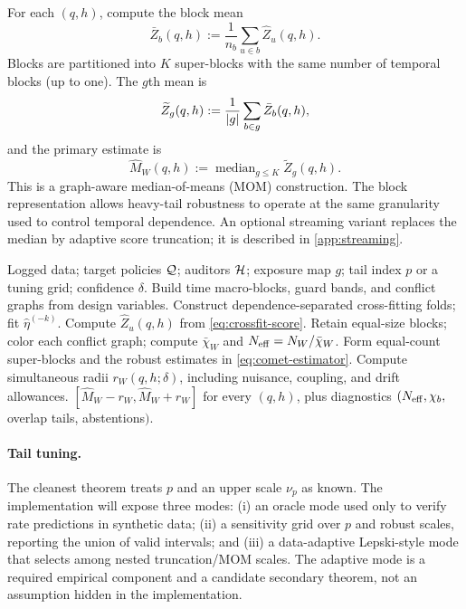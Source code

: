 For each $(q,h)$, compute the block mean
\begin{equation}
    \bar Z_b(q,h):=\frac{1}{n_b}\sum_{u\in b}\widehat Z_u(q,h).
\end{equation}
Blocks are partitioned into $K$ super-blocks with the same number of temporal blocks (up to one). The $g$th mean is
\begin{equation}
    \widetilde Z_g(q,h)
    :=\frac{1}{\left|g\right|}\sum_{b\in g}\bar Z_b(q,h),
\end{equation}
and the primary estimate is
\begin{equation}
    \widehat M_W(q,h):=\operatorname{median}_{g\le K}\widetilde Z_g(q,h).
    \label{eq:comet-estimator}
\end{equation}
This is a graph-aware median-of-means (MOM) construction. The block representation allows heavy-tail robustness to operate at the same granularity used to control temporal dependence. An optional streaming variant replaces the median by adaptive score truncation; it is described in \cref{app:streaming}.

\begin{algorithm}[t]
\caption{\COMET\ certification for a finite policy--auditor family}
\label{alg:comet}
\begin{algorithmic}[1]
\Require Logged data; target policies $\mathcal{Q}$; auditors $\mathcal{H}$; exposure map $g$; tail index $p$ or a tuning grid; confidence $\delta$.
\State Build time macro-blocks, guard bands, and conflict graphs from design variables.
\State Construct dependence-separated cross-fitting folds; fit $\widehat\eta^{(-k)}$.
    \State Compute $\widehat Z_u(q,h)$ from \cref{eq:crossfit-score}.
\EndFor
\State Retain equal-size blocks; color each conflict graph; compute $\bar\chi_W$ and $N_{\mathrm{eff}}=N_W/\bar\chi_W$.
\State Form equal-count super-blocks and the robust estimates in \cref{eq:comet-estimator}.
\State Compute simultaneous radii $r_W(q,h;\delta)$, including nuisance, coupling, and drift allowances.
\State \Return $[\widehat M_W-r_W,\widehat M_W+r_W]$ for every $(q,h)$, plus diagnostics $(N_{\mathrm{eff}},\chi_b,$ overlap tails, abstentions$)$.
\end{algorithmic}
\end{algorithm}

\paragraph{Tail tuning.}
The cleanest theorem treats $p$ and an upper scale $\nu_p$ as known. The implementation will expose three modes: (i) an oracle mode used only to verify rate predictions in synthetic data; (ii) a sensitivity grid over $p$ and robust scales, reporting the union of valid intervals; and (iii) a data-adaptive Lepski-style mode that selects among nested truncation/MOM scales. The adaptive mode is a required empirical component and a candidate secondary theorem, not an assumption hidden in the implementation.

